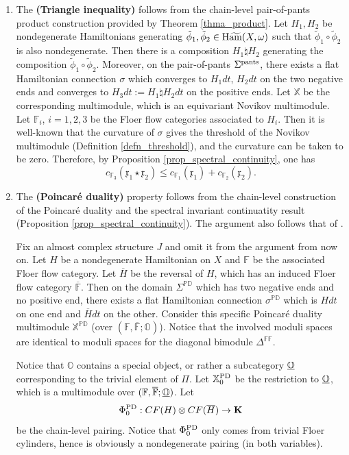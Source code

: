 \documentclass[reqno, 10pt]{amsart}
\numberwithin{equation}{section}
\numberwithin{equation}{section}
\theoremstyle{definition}
\theoremstyle{remark}
\newcommand{\beqn}{\begin{equation*}}
\newcommand{\eeqn}{\end{equation*}}
\newcommand{\ov}{\overline}
\newcommand{\mb}{\mathbb}
\newcommand{\mf}{\mathfrak}
\newcommand{\wt}{\widetilde}
\newcommand{\wham}{{\rm H}\wt{\rm am}}
\newcommand{\uds}[1]{\underline{\smash{#1}}}
\begin{document}
\begin{enumerate}
    \item The {\bf (Triangle inequality)} follows from the chain-level pair-of-pants product construction provided by Theorem \ref{thma_product}. Let $H_1, H_2$ be nondegenerate Hamiltonians generating $\tilde \phi_1, \tilde \phi_2\in \wham(X, \omega)$ such that $\tilde\phi_1 \circ \tilde\phi_2$ is also nondegenerate. Then there is a composition $H_1 \natural H_2$ generating the composition $\tilde\phi_1 \circ \tilde \phi_2$. Moreover, on the pair-of-pants $\Sigma^{\rm pants}$, there exists a flat Hamiltonian connection $\sigma$ which converges to $H_1 dt$, $H_2 dt$ on the two negative ends and converges to $H_3dt:= H_1 \natural H_2 dt$ on the positive ends. Let ${\mb X}$ be the corresponding multimodule, which is an equivariant Novikov multimodule. Let ${\mb F}_i$, $i = 1, 2, 3$ be the Floer flow categories associated to $H_i$. Then it is well-known that the curvature of $\sigma$ gives the threshold of the Novikov multimodule (Definition \ref{defn_threshold}), and the curvature can be taken to be zero. Therefore, by Proposition \ref{prop_spectral_continuity}, one has 
    \beqn
    c_{{\mb F}_3}( {\mf x}_1 \star {\mf x}_2) \leq c_{{\mb F}_1} ({\mf x}_1) + c_{\mb{F}_2} ({\mf x}_2).
    \eeqn

\item The {\bf (Poincar\'e duality)} property follows from the chain-level construction of the Poincar\'e duality and the spectral invariant continuatity result (Proposition \ref{prop_spectral_continuity}). The argument also follows that of \cite[Lemma 5.1]{Ostrover_2006}. 


Fix an almost complex structure $J$ and omit it from the argument from now on. Let $H$ be a nondegenerate Hamiltonian on $X$ and ${\mb F}$ be the associated Floer flow category. Let $\ov{H}$ be the reversal of $H$, which has an induced Floer flow category $\ov{\mb F}$. Then on the domain $\Sigma^{\mb{PD}}$ which has two negative ends and no positive end, there exists a flat Hamiltonian connection $\sigma^{\mb{PD}}$ which is $H dt$ on one end and $\ov{H} dt$ on the other. Consider this specific Poincar\'e duality multimodule ${\mb X}^{\mb{PD}}$ (over $({\mb F}, \ov{{\mb F}}; {\mb O})$). Notice that the involved moduli spaces are identical to moduli spaces for the diagonal bimodule $\mb{\Delta}^{\mb{F}{\mb F}}$. 

Notice that ${\mb O}$ contains a special object, or rather a subcategory $\uds{\mb O}$ corresponding to the trivial element of $\Pi$. Let ${\mb X}_0^{\rm PD}$ be the restriction to $\uds {\mb O}$, which is a multimodule over $({\mb F}, \ov{\mb F}; \uds {\mb O})$. Let
\beqn
\Phi_0^{\rm PD}: CF(H) \otimes CF(\ov{H}) \to {\bf K}
\eeqn
be the chain-level pairing. Notice that $\Phi_0^{\rm PD}$ only comes from trivial Floer cylinders, hence is obviously a nondegenerate pairing (in both variables). 


\end{enumerate}
\end{document}
